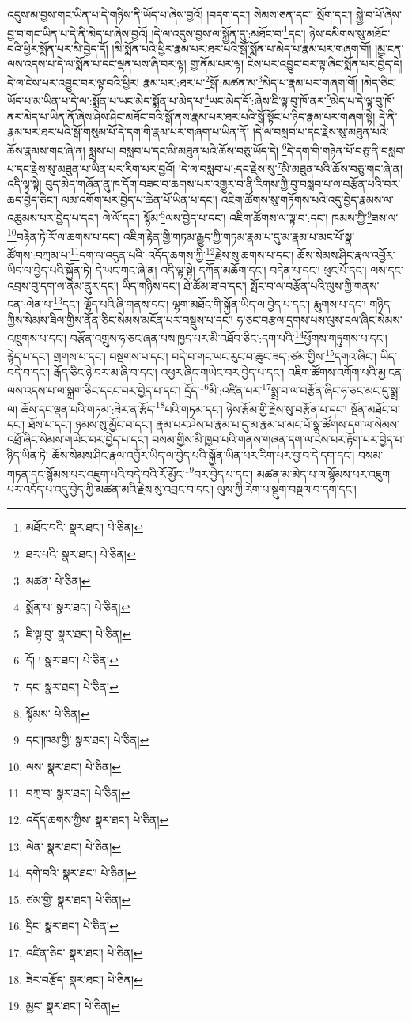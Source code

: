 འདུས་མ་བྱས་གང་ཡིན་པ་དེ་གཉིས་ནི་ཡོད་པ་ཞེས་བྱའོ། །བདག་དང་། སེམས་ཅན་དང་། སྲོག་དང་། སྐྱེ་བ་པོ་ཞེས་བྱ་བ་གང་ཡིན་པ་དེ་ནི་མེད་པ་ཞེས་བྱའོ། །དེ་ལ་འདུས་བྱས་ལ་སྐྱོན་དུ་:མཐོང་བ་\footnote{མཐོང་བའི་  སྣར་ཐང་།  པེ་ཅིན། }དང་། ཉེས་དམིགས་སུ་མཐོང་བའི་ཕྱིར་སྨོན་པར་མི་བྱེད་དོ། །མི་སྨོན་པའི་ཕྱིར་རྣམ་པར་ཐར་པའི་སྒོ་སྨོན་པ་མེད་པ་རྣམ་པར་གཞག་གོ། །མྱ་ངན་ལས་འདས་པ་དེ་ལ་སྨོན་པ་དང་ལྡན་པས་ཞི་བར་ལྟ། གྱ་ནོམ་པར་ལྟ། ངེས་པར་འབྱུང་བར་ལྟ་ཞིང་སྨོན་པར་བྱེད་དེ། དེ་ལ་ངེས་པར་འབྱུང་བར་ལྟ་བའི་ཕྱིར། རྣམ་པར་:ཐར་པ་\footnote{ཐར་པའི་  སྣར་ཐང་།  པེ་ཅིན། }སྒོ་:མཚན་མ་\footnote{མཚན་  པེ་ཅིན། }མེད་པ་རྣམ་པར་གཞག་གོ། །མེད་ཅིང་ཡོད་པ་མ་ཡིན་པ་དེ་ལ་:སྨོན་པ་ཡང་མེད་སྨོན་པ་མེད་པ་\footnote{སྨོན་པ་  སྣར་ཐང་།  པེ་ཅིན། }ཡང་མེད་དོ་:ཞེས་ཇི་ལྟ་བུ་ཁོ་ནར་\footnote{ཇི་ལྟ་བུ་  སྣར་ཐང་།  པེ་ཅིན། }མེད་པ་དེ་ལྟ་བུ་ཁོ་ནར་མེད་པ་ཡིན་ནོ་ཞེས་ཤེས་ཤིང་མཐོང་བའི་སྒོ་ནས་རྣམ་པར་ཐར་པའི་སྒོ་སྟོང་པ་ཉིད་རྣམ་པར་གཞག་སྟེ། དེ་ནི་རྣམ་པར་ཐར་པའི་སྒོ་གསུམ་པོ་དེ་དག་གི་རྣམ་པར་གཞག་པ་ཡིན་ནོ། །དེ་ལ་བསླབ་པ་དང་རྗེས་སུ་མཐུན་པའི་ཆོས་རྣམས་གང་ཞེ་ན། སྨྲས་པ། བསླབ་པ་དང་མི་མཐུན་པའི་ཆོས་བཅུ་ཡོད་དེ། \footnote{དོ། །   སྣར་ཐང་།  པེ་ཅིན། }དེ་དག་གི་གཉེན་པོ་བཅུ་ནི་བསླབ་པ་དང་རྗེས་སུ་མཐུན་པ་ཡིན་པར་རིག་པར་བྱའོ། །དེ་ལ་བསླབ་པ་:དང་རྗེས་སུ་\footnote{དང་  སྣར་ཐང་།  པེ་ཅིན། }མི་མཐུན་པའི་ཆོས་བཅུ་གང་ཞེ་ན། འདི་ལྟ་སྟེ། བུད་མེད་གཞོན་ནུ་ཁ་དོག་བཟང་བ་ཆགས་པར་འགྱུར་བ་ནི་རིགས་ཀྱི་བུ་བསླབ་པ་ལ་བརྩོན་པའི་བར་ཆད་བྱེད་ཅིང་། ལམ་འགོག་པར་བྱེད་པ་ཆེན་པོ་ཡིན་པ་དང་། འཇིག་ཚོགས་སུ་གཏོགས་པའི་འདུ་བྱེད་རྣམས་ལ་འཆུམས་པར་བྱེད་པ་དང་། ལེ་ལོ་དང་། སྙོམ་\footnote{སྙོམས་  པེ་ཅིན། }ལས་བྱེད་པ་དང་། འཇིག་ཚོགས་ལ་ལྟ་བ་:དང་། ཁམས་ཀྱི་\footnote{དང་།ཁམ་གྱི་  སྣར་ཐང་།  པེ་ཅིན། }ཟས་ལ་\footnote{ལས་  སྣར་ཐང་།  པེ་ཅིན། }བརྟེན་ཏེ་རོ་ལ་ཆགས་པ་དང་། འཇིག་རྟེན་གྱི་གཏམ་རྒྱུད་ཀྱི་གཏམ་རྣམ་པ་དུ་མ་རྣམ་པ་མང་པོ་སྣ་ཚོགས་:བཀྲམ་པ་\footnote{བཀྲ་བ་  སྣར་ཐང་།  པེ་ཅིན། }དག་ལ་འདུན་པའི་:འདོད་ཆགས་ཀྱི་\footnote{འདོད་ཆགས་ཀྱིས་  སྣར་ཐང་།  པེ་ཅིན། }རྗེས་སུ་ཆགས་པ་དང་། ཆོས་སེམས་ཤིང་རྣལ་འབྱོར་ཡིད་ལ་བྱེད་པའི་སྐྱོན་ཏེ། དེ་ཡང་གང་ཞེ་ན། འདི་ལྟ་སྟེ། དཀོན་མཆོག་དང་། བདེན་པ་དང་། ཕུང་པོ་དང་། ལས་དང་འབྲས་བུ་དག་ལ་ནེམ་ནུར་དང་། ཡིད་གཉིས་དང་། ཐེ་ཚོམ་ཟ་བ་དང་། སྤོང་བ་ལ་བརྩོན་པའི་ལུས་ཀྱི་གནས་ངན་:ལེན་པ་\footnote{ལེན་  སྣར་ཐང་།  པེ་ཅིན། }དང་། ལྷོད་པའི་ཞི་གནས་དང་། ལྷག་མཐོང་གི་སྐྱོན་ཡིད་ལ་བྱེད་པ་དང་། རྨུགས་པ་དང་། གཉིད་ཀྱིས་སེམས་ཟིལ་གྱིས་ནོན་ཅིང་སེམས་མངོན་པར་བསྡུས་པ་དང་། ཧ་ཅང་བརྩལ་དྲགས་པས་ལུས་ངལ་ཞིང་སེམས་འཁྲུགས་པ་དང་། བརྩོན་འགྲུས་ཧ་ཅང་ཞན་པས་ཁྱད་པར་མི་འཐོབ་ཅིང་:དག་པའི་\footnote{དགེ་བའི་  སྣར་ཐང་།  པེ་ཅིན། }ཕྱོགས་གཏུགས་པ་དང་། རྙེད་པ་དང་། གྲགས་པ་དང་། བསྔགས་པ་དང་། བདེ་བ་གང་ཡང་རུང་བ་ཆུང་ཟད་:ཙམ་གྱིས་\footnote{ཙམ་གྱི་  སྣར་ཐང་།  པེ་ཅིན། }དགའ་ཞིང་། ཡིད་བདེ་བ་དང་། རྒོད་ཅིང་ཉེ་བར་མ་ཞི་བ་དང་། འཕྱར་ཞིང་གཡེང་བར་བྱེད་པ་དང་། འཇིག་ཚོགས་འགོག་པའི་མྱ་ངན་ལས་འདས་པ་ལ་སྐྲག་ཅིང་དངང་བར་བྱེད་པ་དང་། དྲོད་\footnote{དྲིང་  སྣར་ཐང་།  པེ་ཅིན། }མི་:འཛིན་པར་\footnote{འཛིན་ཅིང་  སྣར་ཐང་།  པེ་ཅིན། }སྨྲ་བ་ལ་བརྩོན་ཞིང་ཧ་ཅང་མང་དུ་སྨྲ་ལ། ཆོས་དང་ལྡན་པའི་གཏམ་:ཟེར་ན་རྩོད་\footnote{ཟེར་བརྩོད་  སྣར་ཐང་།  པེ་ཅིན། }པའི་གཏམ་དང་། ཉེས་རྩོམ་གྱི་རྗེས་སུ་བརྩོན་པ་དང་། སྔོན་མཐོང་བ་དང་། ཐོས་པ་དང་། ཉམས་སུ་མྱོང་བ་དང་། རྣམ་པར་ཤེས་པ་རྣམ་པ་དུ་མ་རྣམ་པ་མང་པོ་སྣ་ཚོགས་དག་ལ་སེམས་འཕྲོ་ཞིང་སེམས་གཡེང་བར་བྱེད་པ་དང་། བསམ་གྱིས་མི་ཁྱབ་པའི་གནས་གཞན་དག་ལ་ངེས་པར་རྟོག་པར་བྱེད་པ་ཉིད་ཡིན་ཏེ། ཆོས་སེམས་ཤིང་རྣལ་འབྱོར་ཡིད་ལ་བྱེད་པའི་སྐྱོན་ཡིན་པར་རིག་པར་བྱ་བ་དེ་དག་དང་། བསམ་གཏན་དང་སྙོམས་པར་འཇུག་པའི་བདེ་བའི་རོ་མྱོང་\footnote{མྱང་  སྣར་ཐང་།  པེ་ཅིན། }བར་བྱེད་པ་དང་། མཚན་མ་མེད་པ་ལ་སྙོམས་པར་འཇུག་པར་འདོད་པ་འདུ་བྱེད་ཀྱི་མཚན་མའི་རྗེས་སུ་འབྲང་བ་དང་། ལུས་ཀྱི་རེག་པ་སྡུག་བསྔལ་བ་དག་དང་། 